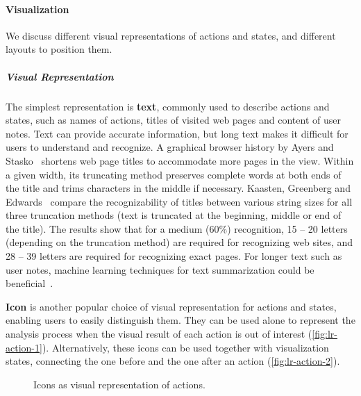 \paragraph{Visualization}
We discuss different visual representations of actions and states, and different layouts to position them.
 
\subparagraph{Visual Representation}
The simplest representation is \textbf{text}, commonly used to describe actions and states, such as names of actions, titles of visited web pages and content of user notes. Text can provide accurate information, but long text makes it difficult for users to understand and recognize. A graphical browser history by Ayers and Stasko~\cite{Ayers1995} shortens web page titles to accommodate more pages in the view. Within a given width, its truncating method preserves complete words at both ends of the title and trims characters in the middle if necessary. Kaasten, Greenberg and Edwards~\cite{Kaasten2001} compare the recognizability of titles between various string sizes for all three truncation methods (text is truncated at the beginning, middle or end of the title). The results show that for a medium (60\%) recognition, 15 -- 20 letters (depending on
the truncation method) are required for recognizing web sites, and 28 -- 39 letters are required for recognizing exact pages. For longer text such as user notes, machine learning techniques for text summarization could be beneficial~\cite{Nenkova2012}.

\textbf{Icon} is another popular choice of visual representation for actions and states, enabling users to easily distinguish them. They can be used alone to represent the analysis process when the visual result of each action is out of interest (\autoref{fig:lr-action-1}). Alternatively, these icons can be used together with visualization states, connecting the one before and the one after an action (\autoref{fig:lr-action-2}).

\begin{figure}[!htb]
\centering
{}

\vspace{.5\baselineskip}

\caption{Icons as visual representation of actions.}
\end{figure}

